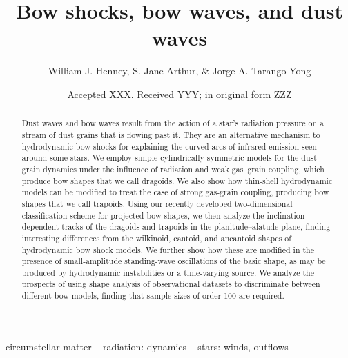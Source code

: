 \documentclass[useAMS, usenatbib, a4paper]{mnras}
\title
{Bow shocks, bow waves, and dust waves}
\author[Henney, Arthur, \& Tarango Yong]{
  William J. Henney, S. Jane Arthur, \& Jorge A. Tarango Yong\\
  \AddressCRyA
}
\date{Accepted XXX. Received YYY; in original form ZZZ}
\begin{document}
\label{firstpage}
\pagerange{\pageref{firstpage}--\pageref{lastpage}}
\maketitle
\begin{abstract}
  Dust waves and bow waves result from the action of a star's
  radiation pressure on a stream of dust grains that is flowing past
  it.  They are an alternative mechanism to hydrodynamic bow shocks
  for explaining the curved arcs of infrared emission seen around some
  stars.  We employ simple cylindrically symmetric models for the dust
  grain dynamics under the influence of radiation and weak gas--grain
  coupling, which produce bow shapes that we call dragoids.  We also
  show how thin-shell hydrodynamic models can be modified to treat the
  case of strong gas-grain coupling, producing bow shapes that we call
  trapoids.  Using our recently developed two-dimensional
  classification scheme for projected bow shapes, we then analyze the
  inclination-dependent tracks of the dragoids and trapoids in the
  planitude--alatude plane, finding interesting differences from the
  wilkinoid, cantoid, and ancantoid shapes of hydrodynamic bow shock
  models. We further show how these are modified in the presence of
  small-amplitude standing-wave oscillations of the basic shape, as
  may be produced by hydrodynamic instabilities or a time-varying
  source.  We analyze the prospects of using shape analysis of
  observational datasets to discriminate between different bow models,
  finding that sample sizes of order 100 are required.
\end{abstract}

\begin{keywords}
  circumstellar matter -- radiation: dynamics -- stars: winds, outflows
\end{keywords}








\appendix



\bsp	%
\label{lastpage}
\end{document}
